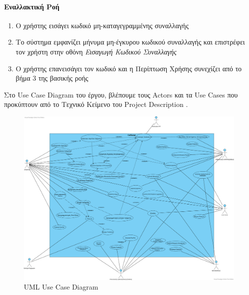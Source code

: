 \documentclass{../ol-softwaremanual}
\begin{document}
	\paragraph{Εναλλακτική Ροή}
	\begin{enumerate}
		\item Ο χρήστης εισάγει κωδικό μη-καταγεγραμμένης συναλλαγής
		\item Το σύστημα εμφανίζει μήνυμα μη-έγκυρου κωδικού συναλλαγής και επιστρέφει τον χρήστη στην οθόνη \textit{Εισαγωγή Κωδικού Συναλλαγής} 
		\item Ο χρήστης επανεισάγει τον κωδικό και η Περίπτωση Χρήσης συνεχίζει από το βήμα 3 της βασικής ροής
	\end{enumerate}
	
	
	\newpage
	
	
	\vspace{25pt}
	
	\flushleft
	
	Στο \en Use Case Diagram \gr του έργου, βλέπουμε τους \en Actors \gr και τα \en Use Cases \gr που προκύπτουν από το Τεχνικό Κείμενο του \en Project Description \gr.
	
	\begin{figure}[htbp!]
		\includegraphics[scale=0.23]{img/UML_Use_case_diagram.png}
		\caption{\en UML Use Case Diagram \gr}
	\end{figure}
	
	
	
	
\end{document}
